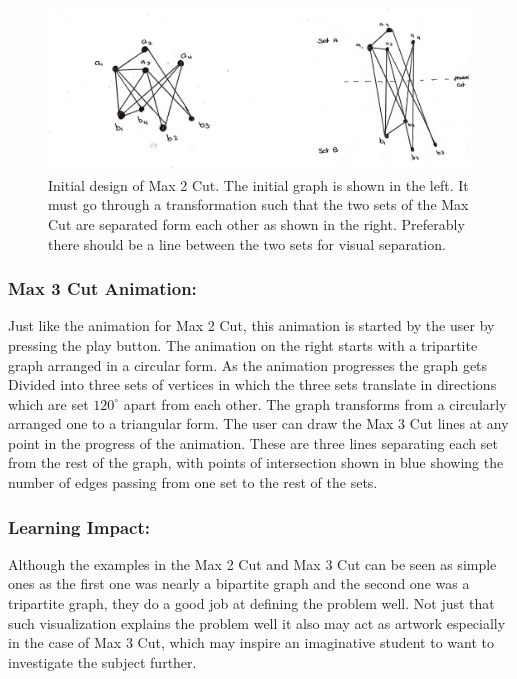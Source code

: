 \begin{figure}[h]
\centering
\includegraphics[scale=0.2]{maxcutdes}
\caption{
         Initial design of Max 2 Cut. The initial graph is shown in the left. It
         must go through a transformation such that the two sets of the Max
         Cut are separated form each other as shown in the right. Preferably
         there should be a line between the two sets for visual separation.
        }
\end{figure}

\subsubsection{Max 3 Cut Animation:}
\label{story: max3cut}
Just like the animation for Max 2 Cut, this animation is started by the user by
pressing the play button. The animation on the right starts with a tripartite
graph arranged in a circular form. As the animation progresses the graph gets
Divided into three sets of vertices in which the three sets translate in
directions which are set $120^{\circ}$ apart from each other. The graph
transforms from a circularly arranged one to a triangular form. The user can
draw the Max 3 Cut lines at any point in the progress of the animation.  These
are three lines separating each set from the rest of the graph, with points of
intersection shown in blue showing the number of edges passing from one set to
the rest of the sets.

\subsubsection{Learning Impact:}
Although the examples in the Max 2 Cut and Max 3 Cut can be seen as simple ones
as the first one was nearly a bipartite graph and the second one was a
tripartite graph, they do a good job at defining the problem well. 
Not just that such visualization explains the problem well it also may act
as artwork especially in the case of Max 3 Cut, which may inspire an
imaginative student to want to investigate the subject further.


